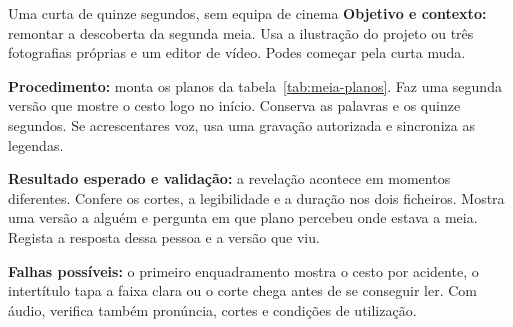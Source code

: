 \begin{promptlabbox}{Uma curta de quinze segundos, sem equipa de cinema}
\textbf{Objetivo e contexto:} remontar a descoberta da segunda meia. Usa a ilustração do projeto ou três fotografias próprias e um editor de vídeo. Podes começar pela curta muda.

\textbf{Procedimento:} monta os planos da tabela~\ref{tab:meia-planos}. Faz uma segunda versão que mostre o cesto logo no início. Conserva as palavras e os quinze segundos. Se acrescentares voz, usa uma gravação autorizada e sincroniza as legendas.

\textbf{Resultado esperado e validação:} a revelação acontece em momentos diferentes. Confere os cortes, a legibilidade e a duração nos dois ficheiros. Mostra uma versão a alguém e pergunta em que plano percebeu onde estava a meia. Regista a resposta dessa pessoa e a versão que viu.

\textbf{Falhas possíveis:} o primeiro enquadramento mostra o cesto por acidente, o intertítulo tapa a faixa clara ou o corte chega antes de se conseguir ler. Com áudio, verifica também pronúncia, cortes e condições de utilização.
\end{promptlabbox}
